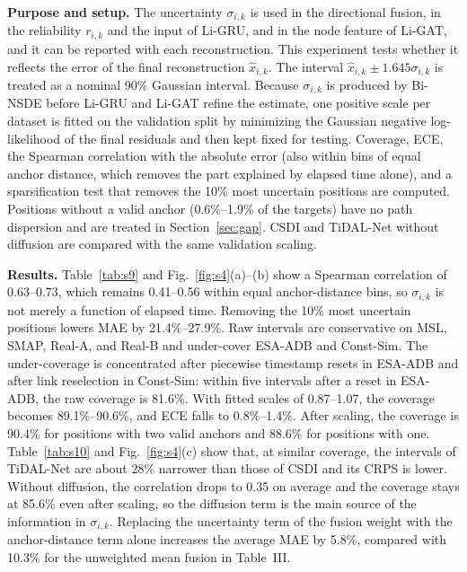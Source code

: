 \documentclass[10pt,a4paper]{article}
\begin{document}
\textbf{Purpose and setup.} The uncertainty $\sigma_{i,k}$ is used in the directional fusion, in the reliability $r_{i,k}$ and the input of Li-GRU, and in the node feature of Li-GAT, and it can be reported with each reconstruction. This experiment tests whether it reflects the error of the final reconstruction $\hat x_{i,k}$. The interval $\hat x_{i,k}\pm1.645\sigma_{i,k}$ is treated as a nominal 90\% Gaussian interval. Because $\sigma_{i,k}$ is produced by Bi-NSDE before Li-GRU and Li-GAT refine the estimate, one positive scale per dataset is fitted on the validation split by minimizing the Gaussian negative log-likelihood of the final residuals and then kept fixed for testing. Coverage, ECE, the Spearman correlation with the absolute error (also within bins of equal anchor distance, which removes the part explained by elapsed time alone), and a sparsification test that removes the 10\% most uncertain positions are computed. Positions without a valid anchor (0.6\%--1.9\% of the targets) have no path dispersion and are treated in Section~\ref{sec:gap}. CSDI and TiDAL-Net without diffusion are compared with the same validation scaling.

\textbf{Results.} Table~\ref{tab:s9} and Fig.~\ref{fig:s4}(a)--(b) show a Spearman correlation of 0.63--0.73, which remains 0.41--0.56 within equal anchor-distance bins, so $\sigma_{i,k}$ is not merely a function of elapsed time. Removing the 10\% most uncertain positions lowers MAE by 21.4\%--27.9\%. Raw intervals are conservative on MSL, SMAP, Real-A, and Real-B and under-cover ESA-ADB and Const-Sim. The under-coverage is concentrated after piecewise timestamp resets in ESA-ADB and after link reselection in Const-Sim: within five intervals after a reset in ESA-ADB, the raw coverage is 81.6\%. With fitted scales of 0.87--1.07, the coverage becomes 89.1\%--90.6\%, and ECE falls to 0.8\%--1.4\%. After scaling, the coverage is 90.4\% for positions with two valid anchors and 88.6\% for positions with one. Table~\ref{tab:s10} and Fig.~\ref{fig:s4}(c) show that, at similar coverage, the intervals of TiDAL-Net are about 28\% narrower than those of CSDI and its CRPS is lower. Without diffusion, the correlation drops to 0.35 on average and the coverage stays at 85.6\% even after scaling, so the diffusion term is the main source of the information in $\sigma_{i,k}$. Replacing the uncertainty term of the fusion weight with the anchor-distance term alone increases the average MAE by 5.8\%, compared with 10.3\% for the unweighted mean fusion in Table~III.
\end{document}
